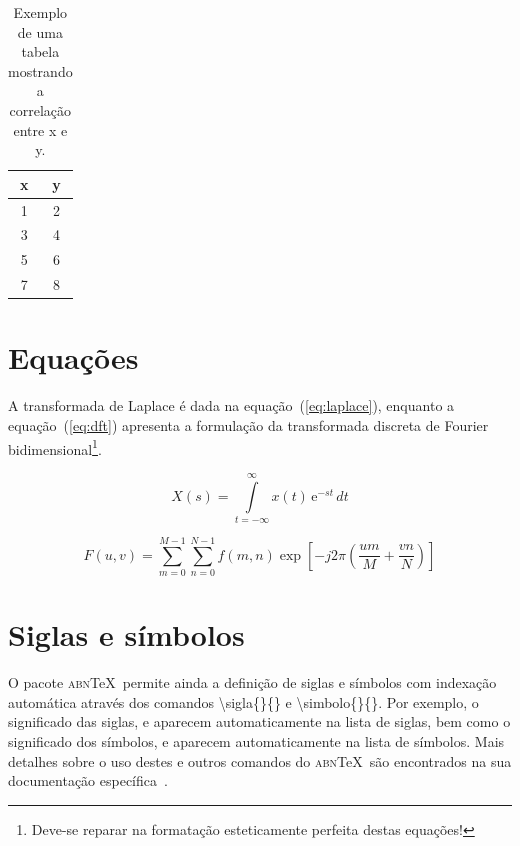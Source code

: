 \documentclass{abnt-UTFPR} %
\begin{document}
\begin{table}[!htb]
	\centering
	\caption[Exemplo de uma tabela]{Exemplo de uma tabela mostrando a correla\c{c}\~ao entre x e y.}
	\label{tab:correlacao}
	\begin{tabular}{cc}
		\hline 
		x & y \\
		\hline
		1 & 2 \\
		3 & 4 \\
		5 & 6 \\
		7 & 8 \\
		\hline 
	\end{tabular}
\end{table}

\section{Equa\c{c}\~oes}

A transformada de Laplace \'e dada na equa\c{c}\~ao~(\ref{eq:laplace}), enquanto a equa\c{c}\~ao~(\ref{eq:dft}) apresenta a formula\c{c}\~ao da transformada discreta de Fourier bidimensional\footnote{Deve-se reparar na formata\c{c}\~ao esteticamente perfeita destas equa\c{c}\~oes!}.

\begin{equation}
X(s) = \int\limits_{t = -\infty}^{\infty} x(t) \, \text{e}^{-st} \, dt
\label{eq:laplace}
\end{equation}

\begin{equation}
F(u, v) = \sum_{m = 0}^{M - 1} \sum_{n = 0}^{N - 1} f(m, n) \exp \left[ -j 2 \pi \left( \frac{u m}{M} + \frac{v n}{N} \right) \right]
\label{eq:dft}
\end{equation}

\section{Siglas e s\'imbolos}

O pacote \textsc{abn}\TeX\ permite ainda a defini\c{c}\~ao de siglas e s\'imbolos com indexa\c{c}\~ao autom\'atica atrav\'es dos comandos {\ttfamily \textbackslash sigla\{\}\{\}} e {\ttfamily \textbackslash simbolo\{\}\{\}}. Por exemplo, o significado das siglas, e aparecem automaticamente na lista de siglas, bem como o significado dos s\'imbolos, e aparecem automaticamente na lista de s\'imbolos. Mais detalhes sobre o uso destes e outros comandos do \textsc{abn}\TeX\ s\~ao encontrados na sua documenta\c{c}\~ao espec\'ifica~\cite{abnTeX2009}.
\end{document}
